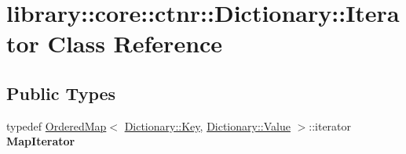 \hypertarget{classlibrary_1_1core_1_1ctnr_1_1_dictionary_1_1_iterator}{}\section{library\+:\+:core\+:\+:ctnr\+:\+:Dictionary\+:\+:Iterator Class Reference}
\label{classlibrary_1_1core_1_1ctnr_1_1_dictionary_1_1_iterator}
\subsection*{Public Types}
\begin{DoxyCompactItemize}
\item 
\mbox{\label{classlibrary_1_1core_1_1ctnr_1_1_dictionary_1_1_iterator_a990205e908ac1bafcd754993219b805e}} 
typedef \hyperlink{_ordered_map_8hpp_a1c0809231c3bc9fccce602bd7941a36b}{Ordered\+Map}$<$ \hyperlink{classlibrary_1_1core_1_1types_1_1_string}{Dictionary\+::\+Key}, \hyperlink{classlibrary_1_1core_1_1ctnr_1_1_object}{Dictionary\+::\+Value} $>$\+::iterator {\bfseries Map\+Iterator}
\end{DoxyCompactItemize}
